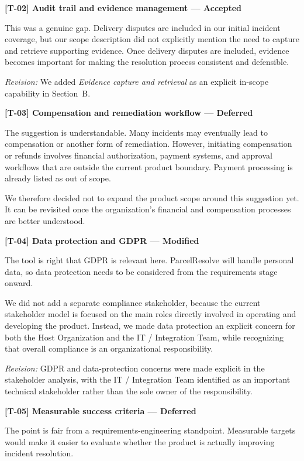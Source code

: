 \documentclass[11pt,a4paper]{article}
\begin{document}
\textbf{[T-02] Audit trail and evidence management --- Accepted}

This was a genuine gap. Delivery disputes are included in our
initial incident coverage, but our scope description did not
explicitly mention the need to capture and retrieve supporting
evidence. Once delivery disputes are included, evidence becomes
important for making the resolution process consistent and
defensible.

\textit{Revision:} We added \textit{Evidence capture and retrieval}
as an explicit in-scope capability in Section~B.

\textbf{[T-03] Compensation and remediation workflow --- Deferred}

The suggestion is understandable. Many incidents may eventually
lead to compensation or another form of remediation. However,
initiating compensation or refunds involves financial authorization,
payment systems, and approval workflows that are outside the current
product boundary. Payment processing is already listed as out of
scope.

We therefore decided not to expand the product scope around this
suggestion yet. It can be revisited once the organization's
financial and compensation processes are better understood.

\textbf{[T-04] Data protection and GDPR --- Modified}

The tool is right that GDPR is relevant here. ParcelResolve will
handle personal data, so data protection needs to be considered
from the requirements stage onward.

We did not add a separate compliance stakeholder, because the
current stakeholder model is focused on the main roles directly
involved in operating and developing the product. Instead, we made
data protection an explicit concern for both the Host Organization
and the IT / Integration Team, while recognizing that overall
compliance is an organizational responsibility.

\textit{Revision:} GDPR and data-protection concerns were made
explicit in the stakeholder analysis, with the IT / Integration
Team identified as an important technical stakeholder rather than
the sole owner of the responsibility.

\textbf{[T-05] Measurable success criteria --- Deferred}

The point is fair from a requirements-engineering standpoint.
Measurable targets would make it easier to evaluate whether the
product is actually improving incident resolution.
\end{document}
